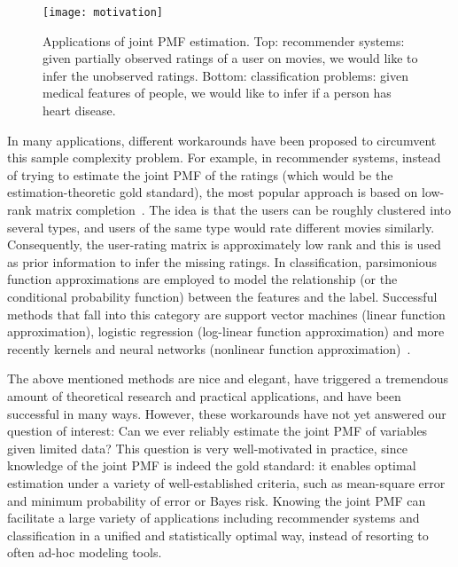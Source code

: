 \documentclass[journal]{IEEEtran}
\begin{document}
\begin{figure}
	\centering
	\texttt{[image: motivation]}
	\caption{Applications of joint PMF estimation. Top: recommender systems: given partially observed ratings of a user on movies, we would like to infer the unobserved ratings.
		Bottom: classification problems: given medical features of people, we would like to infer if a person has heart disease.}
	\label{fig:intro}
\end{figure}

In many applications, different workarounds have been proposed to circumvent this sample complexity problem. 
For example, in recommender systems, instead of trying to estimate the joint PMF of the ratings (which would be the estimation-theoretic gold standard), the most popular approach is based on low-rank matrix completion~\cite{Koren2009,JaNeSa2013,MnSa2008}.
The idea is that the users can be roughly clustered into several types, and users of the same type would rate different movies similarly. Consequently, the user-rating matrix is approximately low rank and this is used as prior information to infer the missing ratings. In classification, parsimonious function approximations are employed to model the relationship (or the conditional probability function) between the features and the label. Successful methods that fall into this category are support vector machines (linear function approximation), logistic regression (log-linear function approximation) and more recently kernels and neural networks (nonlinear function approximation)~\cite{Bi2006}.

The above mentioned methods are nice and elegant, have triggered a tremendous amount of theoretical research and practical applications, and have been successful in many ways. However, these workarounds have not yet answered our question of interest: Can we ever reliably estimate the joint PMF of variables given limited data? This question is very well-motivated in practice, since knowledge of the joint PMF is indeed the gold standard: it enables optimal estimation under a variety of well-established criteria, such as mean-square error and minimum probability of error or Bayes risk. Knowing the joint PMF can facilitate a large variety of applications including recommender systems and classification in a unified and statistically optimal way, instead of resorting to often ad-hoc modeling tools. 
\end{document}
